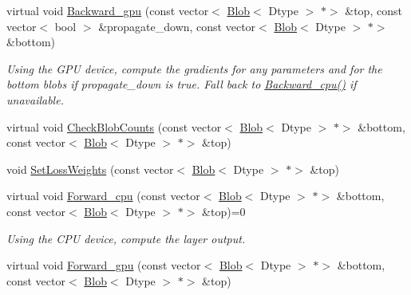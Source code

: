 \begin{DoxyCompactItemize}
\mbox{\label{classcaffe_1_1_layer_a6faee52af6250a38d1b879008257f5a7}} 
virtual void \mbox{\hyperlink{classcaffe_1_1_layer_a6faee52af6250a38d1b879008257f5a7}{Backward\+\_\+gpu}} (const vector$<$ \mbox{\hyperlink{classcaffe_1_1_blob}{Blob}}$<$ Dtype $>$ $\ast$$>$ \&top, const vector$<$ bool $>$ \&propagate\+\_\+down, const vector$<$ \mbox{\hyperlink{classcaffe_1_1_blob}{Blob}}$<$ Dtype $>$ $\ast$$>$ \&bottom)
\begin{DoxyCompactList}\small\item\em Using the G\+PU device, compute the gradients for any parameters and for the bottom blobs if propagate\+\_\+down is true. Fall back to \mbox{\hyperlink{classcaffe_1_1_layer_a75c9b2a321dc713e0eaef530d02dc37f}{Backward\+\_\+cpu()}} if unavailable. \end{DoxyCompactList}\item 
virtual void \mbox{\hyperlink{classcaffe_1_1_layer_a55c8036130225fbc874a986bdf4b27e2}{Check\+Blob\+Counts}} (const vector$<$ \mbox{\hyperlink{classcaffe_1_1_blob}{Blob}}$<$ Dtype $>$ $\ast$$>$ \&bottom, const vector$<$ \mbox{\hyperlink{classcaffe_1_1_blob}{Blob}}$<$ Dtype $>$ $\ast$$>$ \&top)
\item 
void \mbox{\hyperlink{classcaffe_1_1_layer_a04eb2a3d1d59c64cd64c233217d5d6fc}{Set\+Loss\+Weights}} (const vector$<$ \mbox{\hyperlink{classcaffe_1_1_blob}{Blob}}$<$ Dtype $>$ $\ast$$>$ \&top)
\item 
\mbox{\label{classcaffe_1_1_layer_a576ac6a60b1e99fe383831f52a6cea77}} 
virtual void \mbox{\hyperlink{classcaffe_1_1_layer_a576ac6a60b1e99fe383831f52a6cea77}{Forward\+\_\+cpu}} (const vector$<$ \mbox{\hyperlink{classcaffe_1_1_blob}{Blob}}$<$ Dtype $>$ $\ast$$>$ \&bottom, const vector$<$ \mbox{\hyperlink{classcaffe_1_1_blob}{Blob}}$<$ Dtype $>$ $\ast$$>$ \&top)=0
\begin{DoxyCompactList}\small\item\em Using the C\+PU device, compute the layer output. \end{DoxyCompactList}\item 
\mbox{\label{classcaffe_1_1_layer_af3a88d8fb290877b4c7eb37daa3499de}} 
virtual void \mbox{\hyperlink{classcaffe_1_1_layer_af3a88d8fb290877b4c7eb37daa3499de}{Forward\+\_\+gpu}} (const vector$<$ \mbox{\hyperlink{classcaffe_1_1_blob}{Blob}}$<$ Dtype $>$ $\ast$$>$ \&bottom, const vector$<$ \mbox{\hyperlink{classcaffe_1_1_blob}{Blob}}$<$ Dtype $>$ $\ast$$>$ \&top)
$$
\end{DoxyCompactItemize}

